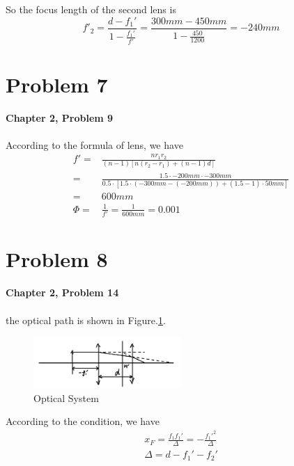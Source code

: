 \documentclass{article}
\begin{document}
So the focus length of the second lens is
\begin{equation}
    \boxed{
        f'_2 = \frac{d-f_1'}{1-\frac{f_1'}{f'}} = \frac{300mm-450mm}{1-\frac{450}{1200}} = -240mm
    }
\end{equation}

\section{Problem 7}
\textbf{Chapter 2, Problem 9}\\\\
According to the formula of lens, we have
\begin{align}
    f' =            & \frac{nr_1r_2}{(n-1)\left[n(r_2-r_1)+(n-1)d\right]}                                                     \\
    =               & \frac{1.5\cdot -200mm \cdot -300mm}{0.5\cdot \left[1.5\cdot (-300mm-(-200mm))+(1.5-1)\cdot 50mm\right]} \\
    =               & \boxed{ 600mm}                                                                                          \\
    \mathit{\Phi} = & \frac{1}{f'} = \frac{1}{600mm} = 0.001
\end{align}

\section{Problem 8}

\textbf{Chapter 2, Problem 14}\\\\
the optical path is shown in Figure.\ref{fig:optical_system_2}.
\begin{figure}[H]
    \centering
    \includegraphics[width=0.5\textwidth]{image/hw2/hw2_4_1.jpeg}
    \caption{Optical System}
    \label{fig:optical_system_2}
\end{figure}

According to the condition, we have
\begin{align}
    x_F = \frac{f_1f_1'}{\Delta} = -\frac{f_1'^2}{\Delta}\\
    \Delta = d-f_1'-f_2'\\
\end{align}
\end{document}

